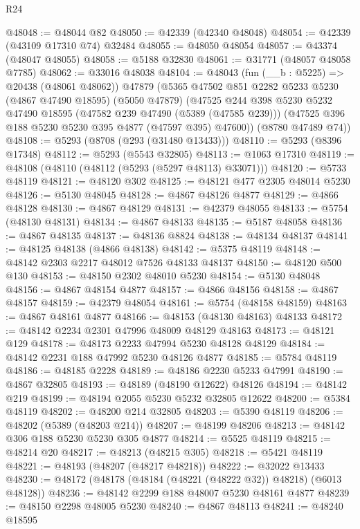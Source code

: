 \begin{lexlean}{R24}
\begin{coremodule}
@48048 := @48044 @82
@48050 := @42339 (@42340 @48048)
@48054 := @42339 (@43109 @17310 @74) @32484
@48055 := @48050 @48054
@48057 := @43374 (@48047 @48055)
@48058 := @5188 @32830
@48061 := @31771 (@48057 @48058 @7785)
@48062 := @33016 @48038
@48104 := @48043
    (fun (__b : @5225) => @20438 (@48061 @48062))
    @47879
    (@5365
      @47502
      @851
      @2282
      @5233
      @5230
      (@4867 @47490 @18595)
      (@5050 @47879)
      (@47525
        @244
        @398
        @5230
        @5232
        @47490
        @18595
        (@47582 @239 @47490 (@5389 (@47585 @239)))
        (@47525 @396 @188 @5230 @5230 @395 @4877 (@47597 @395) @47600))
      (@8780 @47489 @74))
@48108 := @5293 (@8708 (@293 (@31480 @13433)))
@48110 := @5293 (@8396 @17348)
@48112 := @5293 (@5543 @32805)
@48113 := @1063 @17310
@48119 := @48108 (@48110 (@48112 (@5293 (@5297 @48113) @33071)))
@48120 := @5733 @48119
@48121 := @48120 @302
@48125 := @48121 @477 @2305 @48014 @5230
@48126 := @5130 @48045
@48128 := @4867 @48126 @4877
@48129 := @4866 @48128
@48130 := @4867 @48129
@48131 := @42379 @48055
@48133 := @5754 (@48130 @48131)
@48134 := @4867 @48133
@48135 := @5187 @48058
@48136 := @4867 @48135
@48137 := @48136 @8824
@48138 := @48134 @48137
@48141 := @48125 @48138 (@4866 @48138)
@48142 := @5375 @48119
@48148 := @48142 @2303 @2217 @48012 @7526 @48133 @48137
@48150 := @48120 @500 @130
@48153 := @48150 @2302 @48010 @5230
@48154 := @5130 @48048
@48156 := @4867 @48154 @4877
@48157 := @4866 @48156
@48158 := @4867 @48157
@48159 := @42379 @48054
@48161 := @5754 (@48158 @48159)
@48163 := @4867 @48161 @4877
@48166 := @48153 (@48130 @48163) @48133
@48172 := @48142 @2234 @2301 @47996 @48009 @48129 @48163
@48173 := @48121 @129
@48178 := @48173 @2233 @47994 @5230 @48128 @48129
@48184 := @48142 @2231 @188 @47992 @5230 @48126 @4877
@48185 := @5784 @48119
@48186 := @48185 @2228
@48189 := @48186 @2230 @5233 @47991
@48190 := @4867 @32805
@48193 := @48189 (@48190 @12622) @48126
@48194 := @48142 @219
@48199 := @48194 @2055 @5230 @5232 @32805 @12622
@48200 := @5384 @48119
@48202 := @48200 @214 @32805
@48203 := @5390 @48119
@48206 := @48202 (@5389 (@48203 @214))
@48207 := @48199 @48206
@48213 := @48142 @306 @188 @5230 @5230 @305 @4877
@48214 := @5525 @48119
@48215 := @48214 @20
@48217 := @48213 (@48215 @305)
@48218 := @5421 @48119
@48221 := @48193 (@48207 (@48217 @48218))
@48222 := @32022 @13433
@48230 := @48172 (@48178 (@48184 (@48221 (@48222 @32)) @48218) (@6013 @48128))
@48236 := @48142 @2299 @188 @48007 @5230 @48161 @4877
@48239 := @48150 @2298 @48005 @5230
@48240 := @4867 @48113
@48241 := @48240 @18595

\end{coremodule}
\end{lexlean}
